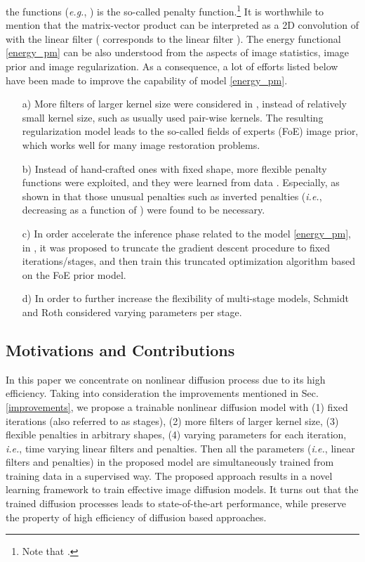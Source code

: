 \documentclass[10pt,journal,compsoc]{IEEEtran}
\newcommand{\eg}{\emph{e.g.}}
\newcommand{\ie}{\emph{i.e.}}
\begin{document}
{the functions  (\eg, ) 
is the so-called penalty function.\footnote{Note that .}  
It is worthwhile to mention that 
the matrix-vector product  can be interpreted as a
2D convolution of  with the linear filter 
( corresponds to the linear filter ). 
The energy functional \eqref{energy_pm} can be also understood from the aspects of 
image statistics, image prior and image regularization. 
As a consequence, a lot of efforts listed below 
have been made to improve the capability of model \eqref{energy_pm}.
\begin{itemize}[leftmargin=*]
\setlength\itemsep{0em}
\item[a)] \noindent 
More filters of larger kernel size were considered in \cite{zhu1997prior, 
RothFOE2009, ChenPRB13, Barbu2009}, instead of relatively 
small kernel size, such as usually used 
pair-wise kernels. The resulting regularization model 
leads to the so-called fields of experts (FoE) \cite{RothFOE2009} 
image prior, which works well 
for many image restoration problems. 
\item[b)] Instead of hand-crafted ones with fixed shape, 
more flexible penalty functions were exploited, and they were learned from 
data \cite{zhu1997prior, ScharrBH03, KrajsekS10, CSF2014}. Especially, 
as shown in \cite{zhu1997prior} that those 
unusual penalties such as inverted penalties 
(\ie,  decreasing as a function of ) 
were found to be necessary.
\item[c)] In order accelerate the inference phase related to the model 
\eqref{energy_pm}, in 
\cite{Barbu2009, DomkeAISTATS2012}, it was proposed to truncate the gradient 
descent procedure to fixed iterations/stages, 
and then train this truncated optimization 
algorithm based on the FoE prior model.
\item[d)] In order to further increase the flexibility of multi-stage models, 
Schmidt and Roth \cite{CSF2014} considered varying parameters per stage.
\end{itemize}
\subsection{Motivations and Contributions}\label{motivations}
In this paper we concentrate on nonlinear diffusion process due to its
high efficiency. Taking into consideration the improvements mentioned
in Sec.  \ref{improvements}, we propose a trainable nonlinear
diffusion model with (1) fixed iterations (also referred to as
stages), (2) more filters of larger kernel size, (3) flexible
penalties in arbitrary shapes, (4) varying parameters for each
iteration, \ie, time varying linear filters and penalties. Then all
the parameters (\ie, linear filters and penalties) in the proposed
model are simultaneously trained from training data in a supervised
way. The proposed approach results in a novel learning framework to
train effective image diffusion models. It turns out that the trained
diffusion processes leads to state-of-the-art performance, while
preserve the property of high efficiency of diffusion based
approaches. }
\end{document}
